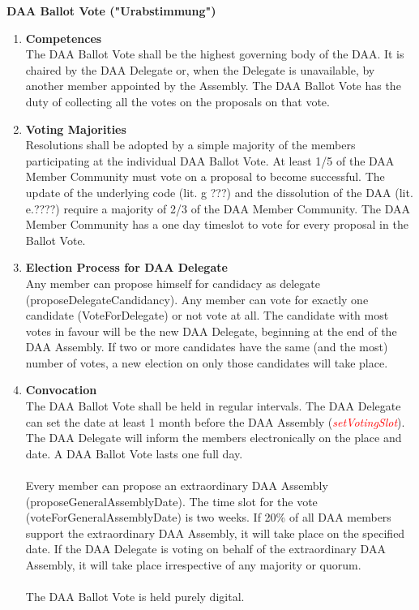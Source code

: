 \item \textbf{DAA Ballot Vote ("Urabstimmung")} \\
\begin{enumerate}[label=\textbf{\arabic*.}]
    \item \textbf{Competences} \\
    The DAA Ballot Vote shall be the highest governing body of the DAA.
    It is chaired by the DAA Delegate or, when the Delegate is unavailable, by another member appointed by the Assembly.
    The DAA Ballot Vote has the duty of collecting all the votes on the proposals on that vote.

    \item \textbf{Voting Majorities} \\
    Resolutions shall be adopted by a simple majority of the members participating at the individual DAA Ballot Vote.
    At least 1/5 of the DAA Member Community must vote on a proposal to become successful.
    The update of the underlying code (lit. g ???) and the dissolution of the DAA (lit. e.????) require a majority of 2/3 of the DAA Member Community. %
    The DAA Member Community has a one day timeslot to vote for every proposal in the Ballot Vote.

    \item \textbf{Election Process for DAA Delegate} \\
    Any member can propose himself for candidacy as delegate (proposeDelegateCandidancy).
    Any member can vote for exactly one candidate (VoteForDelegate) or not vote at all.
    The candidate with most votes in favour will be the new DAA Delegate, beginning at the end of the DAA Assembly.
    If two or more candidates have the same (and the most) number of votes, a new election on only those candidates will take place.

    \item \textbf{Convocation} \\
    The DAA Ballot Vote shall be held in regular intervals.
    The DAA Delegate can set the date at least 1 month before the DAA Assembly (\textcolor{red}{\emph{setVotingSlot}}).
    The DAA Delegate will inform the members electronically on the place and date.
    A DAA Ballot Vote lasts one full day. \\ \\ %

    Every member can propose an extraordinary DAA Assembly (proposeGeneralAssemblyDate). %
    The time slot for the vote (voteForGeneralAssemblyDate) is two weeks.
    If 20\% of all DAA members support the extraordinary DAA Assembly, it will take place on the specified date.
    If the DAA Delegate is voting on behalf of the extraordinary DAA Assembly, it will take place irrespective of any majority or quorum. \\ \\
    The DAA Ballot Vote is held purely digital.


\end{enumerate}
